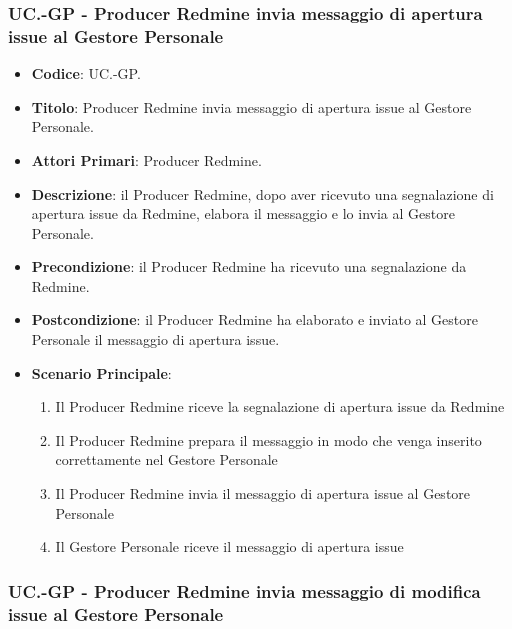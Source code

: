 	\subsubsection{UC\theuccount.\thesubuccount-GP - Producer Redmine invia messaggio di apertura issue al Gestore Personale}

	\begin{itemize}
		\item \textbf{Codice}: UC\theuccount.\thesubuccount-GP.
		\item \textbf{Titolo}: Producer Redmine invia messaggio di apertura issue al Gestore Personale.
		\item \textbf{Attori Primari}: Producer Redmine.
		\item \textbf{Descrizione}: il Producer Redmine, dopo aver
		ricevuto una segnalazione di apertura issue da Redmine, elabora il messaggio e lo invia al Gestore Personale.
		\item \textbf{Precondizione}: il Producer Redmine ha ricevuto una segnalazione da Redmine.
		\item \textbf{Postcondizione}: il Producer Redmine ha elaborato e inviato al Gestore Personale il messaggio di apertura issue.
		\item \textbf{Scenario Principale}:
		\begin{enumerate}
			\item Il Producer Redmine riceve la segnalazione di apertura issue da Redmine
			\item Il Producer Redmine prepara il messaggio in modo che venga inserito correttamente nel Gestore Personale
			\item Il Producer Redmine invia il messaggio di
			apertura issue al Gestore Personale
            \item Il Gestore Personale riceve il messaggio di apertura issue
		\end{enumerate}
	\end{itemize}

	\subsubsection{UC\theuccount.\thesubuccount-GP - Producer Redmine invia messaggio di modifica issue al Gestore Personale}

